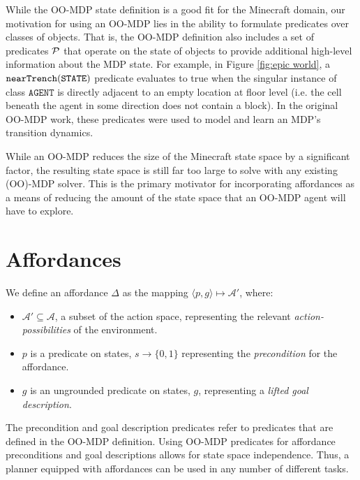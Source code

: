 \documentclass[conference]{IEEEtran}
\newcommand{\stnote}[1]{\textcolor{Blue}{\textbf{ST: #1}}}
\begin{document}
While the OO-MDP state definition is a good fit for the Minecraft
domain, our motivation for using an OO-MDP lies in the ability to
formulate predicates over classes of objects. That is, the OO-MDP
definition also includes a set of predicates ${\cal P}$ that operate
on the state of objects to provide additional high-level information
about the MDP state. For example, in Figure \ref{fig:epic world}, a ${\tt
  nearTrench}({\tt STATE})$ predicate evaluates to true when the
singular instance of class $\texttt{AGENT}$ is directly adjacent to an
empty location at floor level (i.e. the cell beneath the agent in some
direction does not contain a block). In the original OO-MDP work,
these predicates were used to model and learn an MDP's transition
dynamics.

While an OO-MDP reduces the size of the Minecraft state space
by a significant factor, the resulting state space is still far too large to
solve with any existing (OO)-MDP solver. This is the primary motivator
for incorporating affordances as a means of reducing the amount of the
state space that an OO-MDP agent will have to explore.

\section{Affordances}
\label{sec:affordances}

We define an affordance $\Delta$ 
as the mapping $\langle p,g\rangle \longmapsto \mathcal{A}'$,
where:
\begin{itemize}
\item[] $\mathcal{A}' \subseteq \mathcal{A}$, a subset of the action space, representing the relevant {\it action-possibilities} of the environment.
\item[] $p$ is a predicate on states, $s \longrightarrow \{$0$, 1\}$
  representing the {\em precondition} for the affordance.
\item[] $g$ is an ungrounded predicate on states, $g$, representing a {\it lifted goal description}.
\end{itemize}
The precondition and goal description predicates refer to predicates that are defined in the OO-MDP definition. 
Using OO-MDP predicates for affordance preconditions and goal descriptions 
allows for state space independence. Thus, a planner equipped with
affordances can be used in any number of different tasks. 
\end{document}
